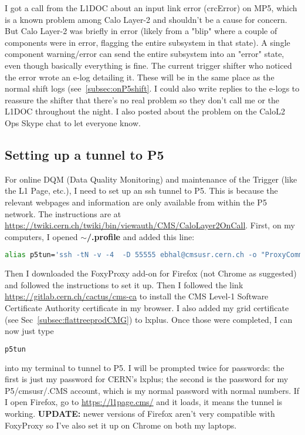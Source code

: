I got a call from the L1DOC about an input link error (crcError) on MP5, which is a known problem among Calo Layer-2 and shouldn't be a cause for concern. But Calo Layer-2 was briefly in error (likely from a "blip" where a couple of components were in error, flagging the entire subsystem in that state). A single component warning/error can send the entire subsystem into an "error" state, even though basically everything is fine. The current trigger shifter who noticed the error wrote an e-log detailing it. These will be in the same place as the normal shift logs (see~\ref{subsec:onP5shift}. I could also write replies to the e-logs to reassure the shifter that there's no real problem so they don't call me or the L1DOC throughout the night. I also posted about the problem on the CaloL2 Ops Skype chat to let everyone know.


\subsection{Setting up a tunnel to P5}

For online DQM (Data Quality Monitoring) and maintenance of the Trigger (like the L1 Page, etc.), I need to set up an ssh tunnel to P5. This is because the relevant webpages and information are only available from within the P5 network. The instructions are at \url{https://twiki.cern.ch/twiki/bin/viewauth/CMS/CaloLayer2OnCall}. First, on my computers, I opened \textbf{$\sim$/.profile} and added this line:

\begin{lstlisting}[belowskip=-0.7cm, language=sh, numbers=none]
alias p5tun='ssh -tN -v -4  -D 55555 ebhal@cmsusr.cern.ch -o "ProxyCommand=ssh ebhal@lxplus.cern.ch -W %h:%p"'
\end{lstlisting}

Then I downloaded the FoxyProxy add-on for Firefox (not Chrome as suggested) and followed the instructions to set it up. Then I followed the link \url{https://gitlab.cern.ch/cactus/cms-ca} to install the CMS Level-1 Software Certificate Authority certificate in my browser. I also added my grid certificate (see Sec~\ref{subsec:flattreeprodCMG}) to lxplus. Once those were completed, I can now just type

\begin{lstlisting}[belowskip=-0.7cm, language=sh, numbers=none]
p5tun
\end{lstlisting}

into my terminal to tunnel to P5. I will be prompted twice for passwords: the first is just my password for CERN's lxplus; the second is the password for my P5/cmsusr/.CMS account, which is my normal password with normal numbers. If I open Firefox, go to \url{https://l1page.cms/} and it loads, it means the tunnel is working. \textbf{UPDATE:} newer versions of Firefox aren't very compatible with FoxyProxy so I've also set it up on Chrome on both my laptops.

